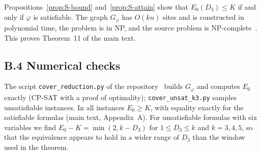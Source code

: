 \documentclass[aps,pre,onecolumn,nofootinbib]{revtex4-2}
\theoremstyle{remark}
\begin{document}
Propositions~\ref{prop:S-bound} and~\ref{prop:S-attain} show that $E_0(D_3)\le K$ if and only if
$\varphi$ is satisfiable. The graph $G_\varphi$ has $O(kn)$ sites and is constructed in polynomial
time, the problem is in NP, and the source problem is NP-complete~\cite{MooreRobson2001}. This
proves Theorem~11 of the main text.

\subsection*{B.4 Numerical checks}

The script \texttt{cover\_reduction.py} of the repository~\cite{AFPottsRepo} builds $G_\varphi$ and
computes $E_0$ exactly (CP-SAT with a proof of optimality); \texttt{cover\_unsat\_k3.py} samples
unsatisfiable instances. In all instances $E_0\ge K$, with equality exactly for the satisfiable
formulas (main text, Appendix~A). For unsatisfiable formulas with six variables we find
$E_0-K=\min(2,k-D_3)$ for $1\le D_3\le k$ and $k=3,4,5$, so that the equivalence appears to hold in
a wider range of $D_3$ than the window used in the theorem.


\end{document}
